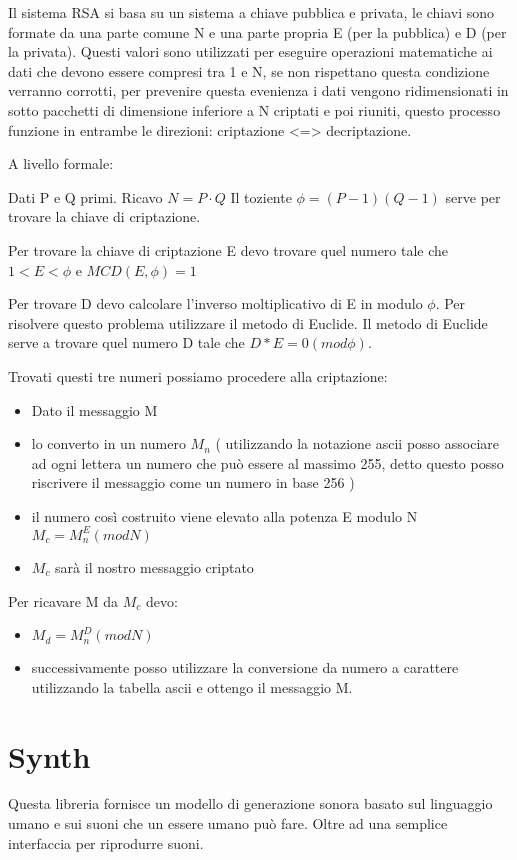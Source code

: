 \documentclass{article}
\begin{document}
Il sistema RSA si basa su un sistema a chiave pubblica e privata, le chiavi sono formate da una parte comune N e una parte propria E (per la pubblica) e D (per la privata).
Questi valori sono utilizzati per eseguire operazioni matematiche ai dati che devono essere compresi tra 1 e N, se non rispettano questa condizione verranno corrotti, per prevenire questa evenienza i dati vengono ridimensionati in sotto pacchetti di dimensione inferiore a N criptati e poi riuniti, questo processo funzione in entrambe le direzioni: criptazione <=> decriptazione.

A livello formale:

Dati P e Q primi.
Ricavo $N = P \cdot Q$
Il toziente $\phi = ( P - 1 ) ( Q - 1 )$ serve per trovare la chiave di criptazione.

Per trovare la chiave di criptazione E devo trovare quel numero tale che $ 1 < E < \phi $ e $ MCD ( E, \phi ) = 1 $

Per trovare D devo calcolare l’inverso moltiplicativo di E in modulo $\phi$. Per risolvere questo problema utilizzare il metodo di Euclide.
Il metodo di Euclide serve a trovare quel numero D tale che $D * E = 0 ( mod \phi )$.

Trovati questi tre numeri possiamo procedere alla criptazione: 

\begin{itemize}
	\item Dato il messaggio M
	\item lo converto in un numero $M_n$ ( utilizzando la notazione ascii posso associare ad ogni lettera un numero che può essere al massimo 255, detto questo posso riscrivere il messaggio come un numero in base 256 )
	\item il numero così costruito viene elevato alla potenza E modulo N $ M_c = M_n^E ( mod N )$ 
	\item $M_c$ sarà il nostro messaggio criptato
\end{itemize}

Per ricavare M da $M_c$ devo:

\begin{itemize}
	\item $M_d = M_n^D ( mod N )$
	\item successivamente posso utilizzare la conversione da numero a carattere utilizzando la tabella ascii e ottengo il messaggio M.
\end{itemize}
 
\section {Synth}
Questa libreria fornisce un modello di generazione sonora basato sul linguaggio umano e sui suoni che un essere umano può fare. Oltre ad una semplice interfaccia per riprodurre suoni.
\end{document}
